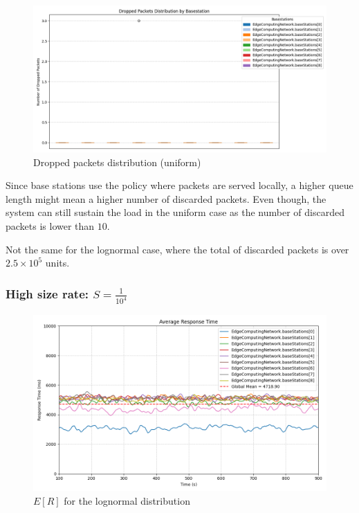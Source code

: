 \documentclass{report}
\begin{document}
\begin{figure}[H]
    \centering
    \includegraphics[width=\textwidth]{img/plots/uni_1e3_A/dropped.png}
    \caption{Dropped packets distribution (uniform)}
\end{figure}

\begin{flushleft}
Since base stations use the policy where packets are served locally, a higher queue length might mean a higher number of discarded packets. Even though, the system can still sustain the load in the uniform case as the number of discarded packets is lower than $10$.

\vspace{1em} 

Not the same for the lognormal case, where the total of discarded packets is over $2.5\times10^5$ units.
\end{flushleft}

\vspace{10mm}

\subsubsection*{High size rate: $S=\frac{1}{10^4}$}

\begin{figure}[H]
    \centering
    \includegraphics[width=\textwidth]{img/plots/log_1e4_A/resptime.png}
    \caption{$E[R]$ for the lognormal distribution}
\end{figure}
\end{document}

